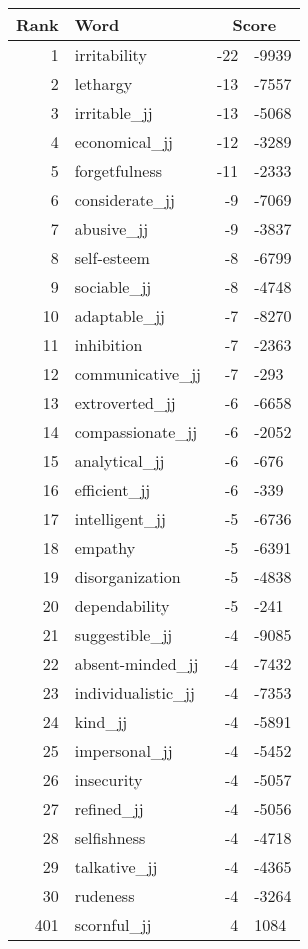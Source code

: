 \begin{longtable}[!htbp]{| rlr@{.}l |}
    \hline
    \textbf{Rank} & \textbf{Word} & \multicolumn{2}{c|}{\textbf{Score}} \\
    \hline
    \endhead
    1 & irritability & -22 & -9939 \\
    2 & lethargy & -13 & -7557 \\
    3 & irritable\_jj & -13 & -5068 \\
    4 & economical\_jj & -12 & -3289 \\
    5 & forgetfulness & -11 & -2333 \\
    6 & considerate\_jj & -9 & -7069 \\
    7 & abusive\_jj & -9 & -3837 \\
    8 & self-esteem & -8 & -6799 \\
    9 & sociable\_jj & -8 & -4748 \\
    10 & adaptable\_jj & -7 & -8270 \\
    11 & inhibition & -7 & -2363 \\
    12 & communicative\_jj & -7 & -293 \\
    13 & extroverted\_jj & -6 & -6658 \\
    14 & compassionate\_jj & -6 & -2052 \\
    15 & analytical\_jj & -6 & -676 \\
    16 & efficient\_jj & -6 & -339 \\
    17 & intelligent\_jj & -5 & -6736 \\
    18 & empathy & -5 & -6391 \\
    19 & disorganization & -5 & -4838 \\
    20 & dependability & -5 & -241 \\
    21 & suggestible\_jj & -4 & -9085 \\
    22 & absent-minded\_jj & -4 & -7432 \\
    23 & individualistic\_jj & -4 & -7353 \\
    24 & kind\_jj & -4 & -5891 \\
    25 & impersonal\_jj & -4 & -5452 \\
    26 & insecurity & -4 & -5057 \\
    27 & refined\_jj & -4 & -5056 \\
    28 & selfishness & -4 & -4718 \\
    29 & talkative\_jj & -4 & -4365 \\
    30 & rudeness & -4 & -3264 \\
    401 & scornful\_jj & 4 & 1084 \\

\end{longtable}
